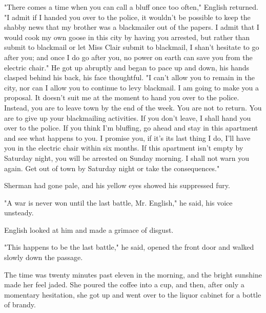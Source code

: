 \documentclass{novel}
\begin{document}
"There comes a time when you can call a bluff once too often," English returned. "I admit if I handed you over to the police, it wouldn't be possible to keep the shabby news that my brother was a blackmailer out of the papers. I admit that I would cook my own goose in this city by having you arrested, but rather than submit to blackmail or let Miss Clair submit to blackmail, I shan't hesitate to go after you; and once I do go after you, no power on earth can save you from the electric chair." He got up abruptly and began to pace up and down, his hands clasped behind his back, his face thoughtful. "I can't allow you to remain in the city, nor can I allow you to continue to levy blackmail. I am going to make you a proposal. It doesn't suit me at the moment to hand you over to the police. Instead, you are to leave town by the end of the week. You are not to return. You are to give up your blackmailing activities. If you don't leave, I shall hand you over to the police. If you think I'm bluffing, go ahead and stay in this apartment and see what happens to you. I promise you, if it's its last thing I do, I'll have you in the electric chair within six months. If this apartment isn't empty by Saturday night, you will be arrested on Sunday morning. I shall not warn you again. Get out of town by Saturday night or take the consequences."

Sherman had gone pale, and his yellow eyes showed his suppressed fury.

"A war is never won until the last battle, Mr. English," he said, his voice unsteady.

English looked at him and made a grimace of disgust.

"This happens to be the last battle," he said, opened the front door and walked slowly down the passage.

\vspace{2\nbs}
\clearpage
\thispagestyle{empty}

\begin{ChapterStart}
\vspace{3\nbs}
\end{ChapterStart}
    
The time was twenty minutes past eleven in the morning, and the bright sunshine made her feel jaded. She poured the coffee into a cup, and then, after only a momentary hesitation, she got up and went over to the liquor cabinet for a bottle of brandy.
\end{document}
